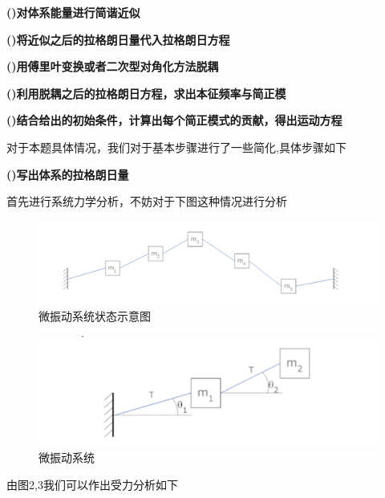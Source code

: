 \documentclass[11pt, a4paper, oneside]{ctexart}
\begin{document}
{\textbf{()对体系能量进行简谐近似}

\textbf{()将近似之后的拉格朗日量代入拉格朗日方程}

\textbf{()用傅里叶变换或者二次型对角化方法脱耦}

\textbf{()利用脱耦之后的拉格朗日方程，求出本征频率与简正模}

\textbf{()结合给出的初始条件，计算出每个简正模式的贡献，得出运动方程}

\vspace{5mm}
对于本题具体情况，我们对于基本步骤进行了一些简化,具体步骤如下

\vspace{5mm}
\textbf{()写出体系的拉格朗日量}
\vspace{5mm}

首先进行系统力学分析，不妨对于下图这种情况进行分析
\begin{figure}[h]
	
    \centering
    \vspace{4mm}
    \includegraphics[scale=0.2]{22.png}
    \caption{微振动系统状态示意图}
\end{figure} 



\begin{figure}[h]
	
    \centering
    \vspace{4mm}
    \includegraphics[scale=0.2]{33.png}
    \caption{微振动系统}
\end{figure} 

由图2,3我们可以作出受力分析如下

\begin{figure}[h]
	

\end{figure}}
\end{document}
